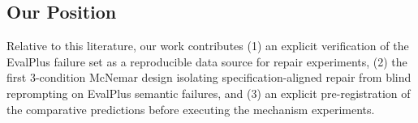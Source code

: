 \subsection{Our Position}

Relative to this literature, our work contributes (1) an explicit verification of the
EvalPlus failure set as a reproducible data source for repair experiments,
(2) the first 3-condition McNemar design isolating specification-aligned repair from
blind reprompting on EvalPlus semantic failures, and (3) an explicit pre-registration
of the comparative predictions before executing the mechanism experiments.
